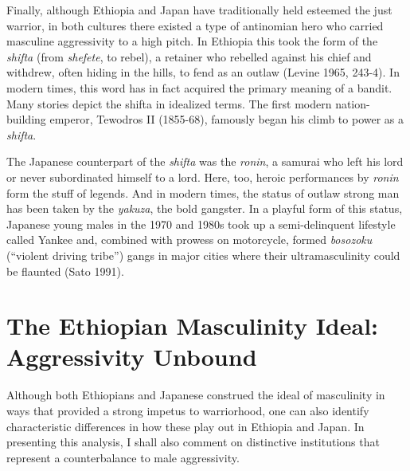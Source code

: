 Finally, although Ethiopia and Japan have traditionally held esteemed the just warrior, in both cultures there existed a type of antinomian hero who carried masculine aggressivity to a high pitch. In Ethiopia this took the form of the \emph{shifta} (from \emph{shefete}, to rebel), a retainer who rebelled against his chief and withdrew, often hiding in the hills, to fend as an outlaw (Levine 1965, 243-4). In modern times, this word has in fact acquired the primary meaning of a bandit. Many stories depict the shifta in idealized terms. The first modern nation-building emperor, Tewodros II (1855-68), famously began his climb to power as a \emph{shifta}. 

The Japanese counterpart of the \emph{shifta} was the \emph{ronin}, a samurai who left his lord or never subordinated himself to a lord. Here, too, heroic performances by \emph{ronin} form the stuff of legends. And in modern times, the status of outlaw strong man has been taken by the \emph{yakuza}, the bold gangster. In a playful form of this status, Japanese young males in the 1970 and 1980s took up a semi-delinquent lifestyle called Yankee and, combined with prowess on motorcycle, formed \emph{bosozoku} (``violent driving tribe'') gangs in major cities where their ultramasculinity could be flaunted (Sato 1991).

\section*{The Ethiopian Masculinity Ideal: Aggressivity Unbound}

Although both Ethiopians and Japanese construed the ideal of masculinity in ways that provided a strong impetus to warriorhood, one can also identify characteristic differences in how these play out in Ethiopia and Japan. In presenting this analysis, I shall also comment on distinctive institutions that represent a counterbalance to male aggressivity. 

